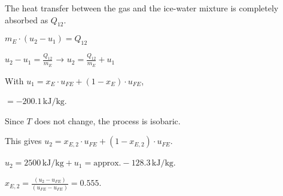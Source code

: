 The heat transfer between the gas and the ice-water mixture is completely absorbed as \( Q_{12} \).  

\( m_E \cdot (u_2 - u_1) = Q_{12} \)  

\( u_2 - u_1 = \frac{Q_{12}}{m_E} \) → \( u_2 = \frac{Q_{12}}{m_E} + u_1 \)  

With \( u_1 = x_E \cdot u_{FE} + (1 - x_E) \cdot u_{FE} \),  

\( = -200.1 \, \text{kJ/kg} \).  

Since \( T \) does not change, the process is isobaric.  

This gives \( u_2 = x_{E,2} \cdot u_{FE} + (1 - x_{E,2}) \cdot u_{FE} \).  

\( u_2 = 2500 \, \text{kJ/kg} + u_1 = \text{approx.} -128.3 \, \text{kJ/kg} \).  

\( x_{E,2} = \frac{(u_2 - u_{FE})}{(u_{FE} - u_{FE})} = 0.555 \).
